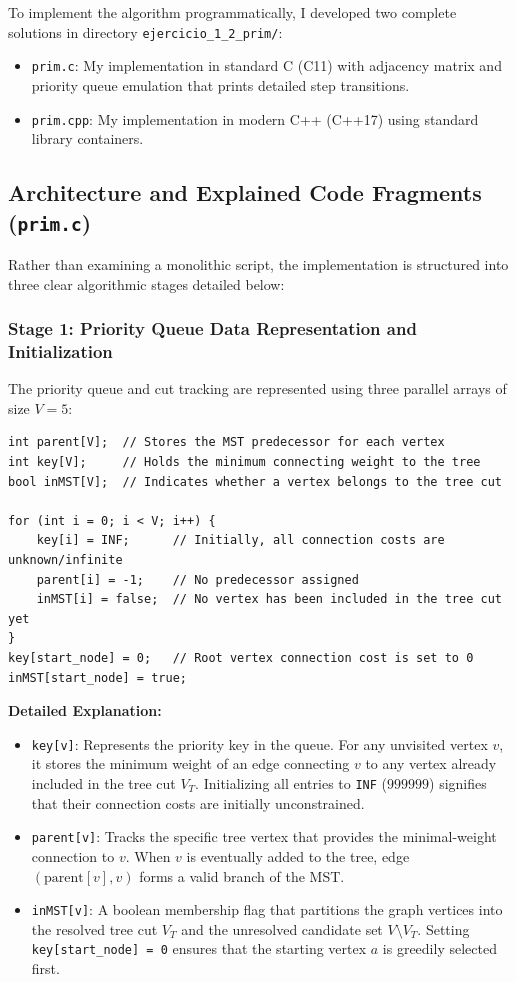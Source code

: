 \documentclass[11pt,a4paper]{article}
\begin{document}
To implement the algorithm programmatically, I developed two complete solutions in directory \texttt{ejercicio\_1\_2\_prim/}:
\begin{itemize}
    \item \texttt{prim.c}: My implementation in standard C (C11) with adjacency matrix and priority queue emulation that prints detailed step transitions.
    \item \texttt{prim.cpp}: My implementation in modern C++ (C++17) using standard library containers.
\end{itemize}

\subsection{Architecture and Explained Code Fragments (\texttt{prim.c})}
Rather than examining a monolithic script, the implementation is structured into three clear algorithmic stages detailed below:

\subsubsection{Stage 1: Priority Queue Data Representation and Initialization}
The priority queue and cut tracking are represented using three parallel arrays of size $V = 5$:

\begin{lstlisting}[style=cstyle, caption={State arrays and initialization for Prim's algorithm}]
int parent[V];  // Stores the MST predecessor for each vertex
int key[V];     // Holds the minimum connecting weight to the tree
bool inMST[V];  // Indicates whether a vertex belongs to the tree cut

for (int i = 0; i < V; i++) {
    key[i] = INF;      // Initially, all connection costs are unknown/infinite
    parent[i] = -1;    // No predecessor assigned
    inMST[i] = false;  // No vertex has been included in the tree cut yet
}
key[start_node] = 0;   // Root vertex connection cost is set to 0
inMST[start_node] = true;
\end{lstlisting}

\noindent \textbf{Detailed Explanation:}
\begin{itemize}
    \item \texttt{key[v]}: Represents the priority key in the queue. For any unvisited vertex $v$, it stores the minimum weight of an edge connecting $v$ to any vertex already included in the tree cut $V_T$. Initializing all entries to \texttt{INF} ($999999$) signifies that their connection costs are initially unconstrained.
    \item \texttt{parent[v]}: Tracks the specific tree vertex that provides the minimal-weight connection to $v$. When $v$ is eventually added to the tree, edge $(\text{parent}[v], v)$ forms a valid branch of the MST.
    \item \texttt{inMST[v]}: A boolean membership flag that partitions the graph vertices into the resolved tree cut $V_T$ and the unresolved candidate set $V \setminus V_T$. Setting \texttt{key[start\_node] = 0} ensures that the starting vertex $a$ is greedily selected first.
\end{itemize}
\end{document}
